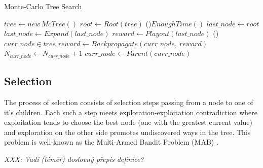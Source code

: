 \begin{algorithm}
\DontPrintSemicolon
\caption{Monte-Carlo Tree Search\label{sec_mcts_description}}
\label{alg_mcts_loop}
$tree \leftarrow new\,McTree()$ \;
$root \leftarrow Root(tree)$\;
\While(){$EnoughTime()$}{
    $last\_node \leftarrow root$ \;
    $last\_node \leftarrow Expand(last\_node)$ \;
    $reward \leftarrow Playout(last\_node)$ \;
    \While(){$curr\_node \in tree$}{
        $reward \leftarrow Backpropagate(curr\_node,\:reward)$\;
        $N_{curr\_node} \leftarrow N_{curr\_node}+1$ \;
        $curr\_node \leftarrow Parent(curr\_node)$\;
    }
}
 \;
\end{algorithm}


\subsection{Selection}

The process of selection consists of selection steps passing from a node to one of it's children.
Each such a step meets exploration-exploitation contradiction where exploitation tends to choose the
best node (one with the greatest current value) and exploration on the other side promotes
undiscovered ways in the tree. This problem is well-known as the Multi-Armed Bandit Problem (MAB)
\cites{Auer2002}{Kocsis2006}. 

\emph{XXX: Vadí (téměř) doslovný přepis definice?}

